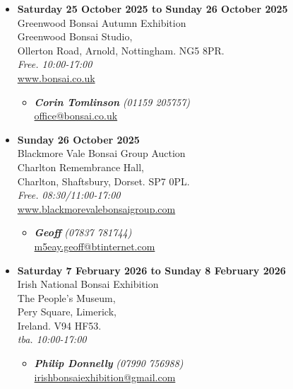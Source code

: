 \begin{itemize}
    \item \textbf{Saturday 25 October 2025 to Sunday 26 October 2025}
    \\
    Greenwood Bonsai Autumn Exhibition \\
    Greenwood Bonsai Studio, \\
    Ollerton Road, Arnold, Nottingham. NG5 8PR.
    \\
    \emph{Free. 10:00-17:00}
    \\
    \href{https://www.bonsai.co.uk}{www.bonsai.co.uk}
    \begin{itemize}
        \item \textbf{\emph{Corin Tomlinson}} \emph{(01159 205757)} \\
        \href{mailto:office@bonsai.co.uk}{office@bonsai.co.uk} 
    \end{itemize}

    \item \textbf{Sunday 26 October 2025}
    \\
    Blackmore Vale Bonsai Group Auction \\
    Charlton Remembrance Hall, \\
    Charlton, Shaftsbury, Dorset. SP7 0PL.
    \\
    \emph{Free. 08:30/11:00-17:00}
    \\
    \href{https://www.blackmorevalebonsaigroup.com}{www.blackmorevalebonsaigroup.com}
    \begin{itemize}
        \item \textbf{\emph{Geoff}} \emph{(07837 781744)} \\
        \href{mailto:m5eay.geoff@btinternet.com}{m5eay.geoff@btinternet.com} 
    \end{itemize}

    \item \textbf{Saturday 7 February 2026 to Sunday 8 February 2026}
    \\
    Irish National Bonsai Exhibition \\
    The People's Museum, \\
    Pery Square, Limerick, \\
    Ireland. V94 HF53.
    \\
    \emph{tba. 10:00-17:00}
    \begin{itemize}
        \item \textbf{\emph{Philip Donnelly}} \emph{(07990 756988)} \\
        \href{mailto:irishbonsaiexhibition@gmail.com}{irishbonsaiexhibition@gmail.com} 
    \end{itemize}


\end{itemize}
